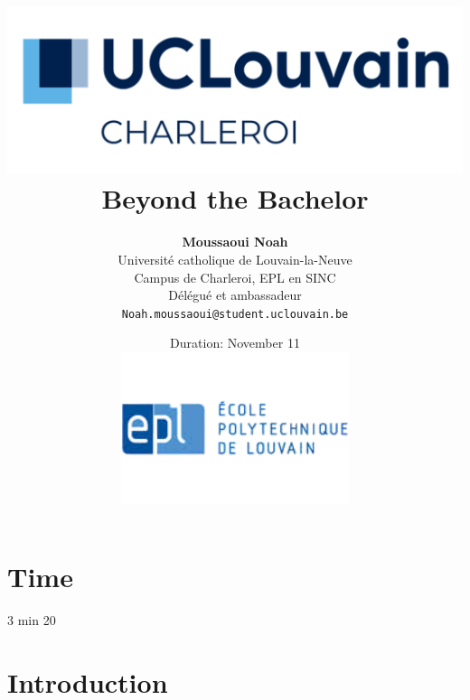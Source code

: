\documentclass{article}
\begin{document}
\title{
    \includegraphics[width=1\textwidth]{photo/UCLouvain_Charleroi.png} \\
    \vspace{1.5cm}
    {\Huge \textbf{Beyond the Bachelor}} \\
    \vspace{1.5cm}
}

\author{
    \textbf{Moussaoui Noah} \\
    Université catholique de Louvain-la-Neuve \\
    Campus de Charleroi, EPL en SINC \\
    Délégué et ambassadeur \\
    \texttt{Noah.moussaoui@student.uclouvain.be}
}

\date{
    \vspace{1.5cm}
    Duration: November 11 \\
    \vspace{1.5cm}
    \includegraphics[width=0.5\textwidth]{photo/EPL.png}
}

\maketitle

\section{Time}
3 min 20

\section{Introduction}
\end{document}
